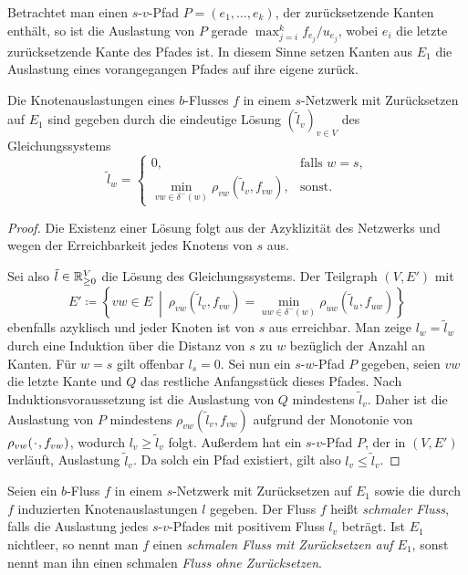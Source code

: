 Betrachtet man einen $s$-$v$-Pfad $P=(e_1, \dots, e_k)$, der zurück\-setzende Kanten ent\-hält, so ist die Auslastung von $P$ gerade $\max_{j=i}^k f_{e_j}/u_{e_j}$, wobei $e_i$ die letzte zurück\-setzende Kante des Pfades ist.
In diesem Sinne setzen Kanten aus $E_1$ die Auslastung eines vorangegangen Pfades auf ihre eigene zurück.

\begin{proposition}\label{prop-congestion-labels-dijkstra}
	Die Knotenauslastungen eines $b$-Flusses $f$ in einem $s$-Netzwerk mit Zurücksetzen auf $E_1$ sind gegeben durch die eindeutige Lösung $(\tilde{l}_v)_{v\in V}$ des Gleichungssystems
	\[
	\tilde{l}_w = \begin{cases}
		0, & \text{falls $w=s$,}\\
		\min_{vw\in \delta^-(w)} \rho_{vw}(\tilde{l}_v, f_{vw}), & \text{sonst.}
	\end{cases}
	\]
\end{proposition}
\begin{proof}
	Die Existenz einer Lösung folgt aus der Azyklizität des Netzwerks und wegen der Erreichbarkeit jedes Knotens von $s$ aus.
	
	Sei also $\tilde{l}\in\mathbb{R}_{\geq 0}^V$ die Lösung des Gleichungssystems.
	Der Teilgraph $(V, E')$ mit \[
	E'\coloneq \left\{ vw\in E ~\middle\vert~ \rho_{vw}(\tilde{l}_v, f_{vw}) = \min_{uw\in\delta^-(w)} \rho_{uw}(\tilde{l}_u, f_{uw}) \right\}
	\]
	ebenfalls azyklisch und jeder Knoten ist von $s$ aus erreichbar.
	Man zeige $l_w = \tilde{l}_w$ durch eine Induktion über die Distanz von $s$ zu $w$ bezüglich der Anzahl an Kanten.
	Für $w=s$ gilt offenbar $l_s = 0$.
	Sei nun ein $s$-$w$-Pfad $P$ gegeben, seien $vw$ die letzte Kante und $Q$ das restliche Anfangsstück dieses Pfades.
	Nach Induktionsvoraussetzung ist die Auslastung von $Q$ mindestens $\tilde{l}_v$.
	Daher ist die Auslastung von $P$ mindestens $\rho_{vw}(\tilde{l}_v, f_{vw})$ aufgrund der Monotonie von $\rho_{vw}(\PlH, f_{vw})$, wodurch $l_v \geq \tilde{l}_v$ folgt.
	Außerdem hat ein $s$-$v$-Pfad $P$, der in $(V, E')$ verläuft, Auslastung $\tilde{l}_v$.
	Da solch ein Pfad existiert, gilt also $l_v \leq \tilde{l}_v$.
\end{proof}

\newcommand{\problemThinFlow}{\textsc{ThinFlow}}
\begin{definition}
	Seien ein $b$-Fluss $f$ in einem $s$-Netzwerk mit Zurück\-setzen auf $E_1$ sowie die durch $f$ induzierten Knotenauslastungen $l$ gegeben.
	Der Fluss $f$ heißt \emph{schmaler Fluss}, falls die Auslastung jedes $s$-$v$-Pfades mit positivem Fluss $l_v$ beträgt.
	Ist $E_1$ nichtleer, so nennt man $f$ einen \emph{schmalen Fluss mit Zurücksetzen auf $E_1$}, sonst nennt man ihn einen schmalen\emph{ Fluss ohne Zurücksetzen}.
\end{definition}

